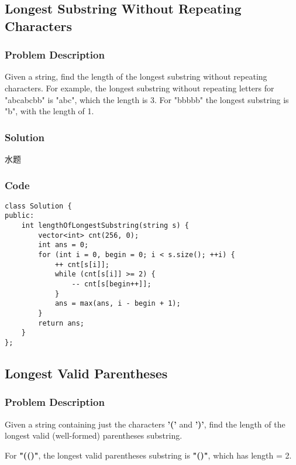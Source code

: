 \documentclass[courier]{article}
\begin{document}
\begin{CJK*}{UTF8}{gkai}
\begin{lstlisting}
\end{lstlisting}


\subsection{ Longest Substring Without Repeating Characters }

\subsubsection*{Problem Description}
Given a string, find the length of the longest substring without repeating characters. For example, the longest substring without repeating letters for "abcabcbb" is "abc", which the length is 3. For "bbbbb" the longest substring is "b", with the length of 1.



\subsubsection*{Solution}
水题

\subsubsection*{Code}
\begin{lstlisting}
class Solution {
public:
    int lengthOfLongestSubstring(string s) {
        vector<int> cnt(256, 0);
        int ans = 0;
        for (int i = 0, begin = 0; i < s.size(); ++i) {
            ++ cnt[s[i]];
            while (cnt[s[i]] >= 2) {
                -- cnt[s[begin++]];
            }
            ans = max(ans, i - begin + 1);
        }
        return ans;
    }
};

\end{lstlisting}


\subsection{ Longest Valid Parentheses }

\subsubsection*{Problem Description}
Given a string containing just the characters \textbf{'('} and \textbf{')'}, find the length of the longest valid (well-formed) parentheses substring.

For \textbf{"(()"}, the longest valid parentheses substring is \textbf{"()"}, which has length = 2.


\end{CJK*}
\end{document}

